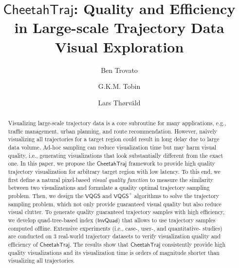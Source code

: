 \documentclass[sigconf,authordraft]{acmart}
\newcommand{\vats}{\mathsf{VQGS}}
\newcommand{\vatss}{\mathsf{VQGS}^+}
\newcommand{\avats}{\mathsf{CheetahTraj}}
\newcommand{\invQ}{\mathsf{InvQuad}}
\begin{document}
\title{$\avats$: Quality and Efficiency in Large-scale Trajectory Data Visual Exploration}

\author{Ben Trovato}
\author{G.K.M. Tobin}
\authornotemark[1]

\author{Lars Th{\o}rv{\"a}ld}


\renewcommand{\shortauthors}{Trovato and Tobin, et al.}

\begin{abstract}
Visualizing large-scale trajectory data is a core subroutine for many applications, e.g., traffic management, urban planning, and route recommendation.
However, naively visualizing all trajectories for a target region could result in long delay due to large data volume.
Ad-hoc sampling can reduce visualization time but may harm visual quality, i.e., generating visualizations that look substantially different from the exact one.
In this paper, we propose the $\avats$ framework to provide high quality trajectory visualization for arbitrary target region with low latency.
To this end, we first define a natural pixel-based \textit{visual quality function} to measure the similarity between two visualizations and formulate a quality optimal trajectory sampling problem.
Then, we design the $\vats$ and $\vatss$ algorithms to solve the trajectory sampling problem, which not only provide guaranteed visual quality but also reduce visual clutter.
To generate quality guaranteed trajectory samples with high efficiency, we develop quad-tree-based index ($\invQ$) that allows to use trajectory samples computed offline.
Extensive experiments (i.e., case-, user-, and quantitative- studies) are conducted on 3 real-world trajectory datasets to verify visualization quality and efficiency of $\avats$. The results show that $\avats$ consistently provide high quality visualizations and its visualization time is orders of magnitude shorter than visualizing all trajectories.   	
\end{abstract}
\end{document}
